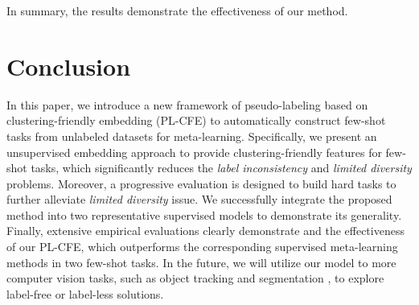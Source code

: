 \documentclass[runningheads]{llncs}
\def\ourmodel{PL-CFE}
\begin{document}
In summary, the results demonstrate the effectiveness of our method. 





\section{Conclusion}
In this paper, we introduce a new framework of {pseudo-labeling based on clustering-friendly embedding} (\ourmodel) to automatically construct few-shot tasks from unlabeled datasets for meta-learning. 
Specifically, we present an unsupervised embedding approach to provide clustering-friendly features for few-shot tasks, which significantly reduces the {\it label inconsistency} and \textit{limited diversity} problems.
Moreover, a progressive evaluation is designed to build hard tasks to further alleviate \textit{limited diversity} issue. We successfully integrate the proposed method into two representative supervised models to demonstrate its generality.   
Finally, extensive empirical evaluations clearly demonstrate and the effectiveness of our \ourmodel, which outperforms the corresponding supervised meta-learning methods in two few-shot tasks. In the future, we will utilize our model to more computer vision tasks, such as object tracking \cite{dong2020clnet,han2021learning,shen2021distilled} and segmentation \cite{wu2022multi,wang2019inferring,dong2015sub}, to explore label-free or label-less solutions.
\clearpage


\end{document}
